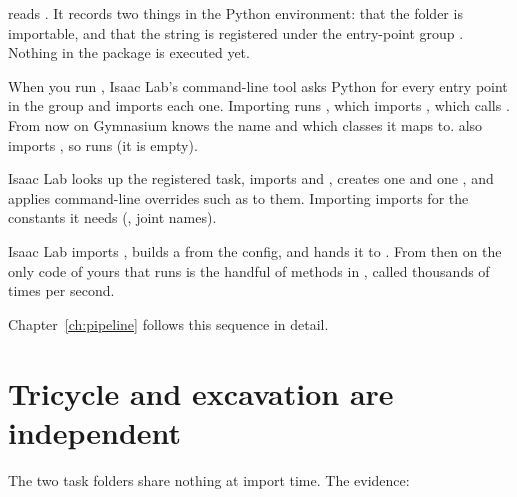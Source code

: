 \begin{description}[leftmargin=1.6em,font=\bfseries]
  \item[Install time]  reads . It
    records two things in the Python environment: that the folder
     is importable, and that the string
     is registered under the entry-point group
    . Nothing in the package is executed yet.
  \item[Start-up time] When you run , Isaac Lab's
    command-line tool asks Python for every entry point in the
     group and imports each one. Importing
     runs , which
    imports , which calls .
    From now on Gymnasium knows the name  and
    which classes it maps to.  also imports
    , so  runs (it is empty).
  \item[Configuration time] Isaac Lab looks up the registered task, imports
     and , creates
    one  and one , and applies
    command-line overrides such as  to them. Importing
     imports  for the constants
    it needs (, joint names).
  \item[Run time] Isaac Lab imports , builds a
     from the config, and hands it to . From
    then on the only code of yours that runs is the handful of methods in
    , called thousands of times per second.
\end{description}

Chapter~\ref{ch:pipeline} follows this sequence in detail.

\section{Tricycle and excavation are independent}
\label{sec:independent}

The two task folders share nothing at import time. The evidence:

